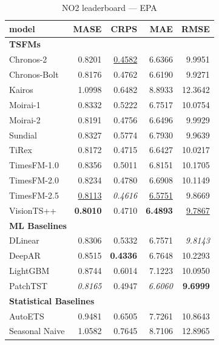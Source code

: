 \begin{table}[H]
\caption{NO2 leaderboard --- EPA}
\centering
\begin{small}
\begin{tabular}{lrrrr}
\toprule
model & MASE & CRPS & MAE & RMSE \\
\midrule
\multicolumn{5}{l}{\textbf{TSFMs}} \\
Chronos-2 & 0.8201 & \underline{0.4582} & 6.6366 & 9.9951 \\
Chronos-Bolt & 0.8176 & 0.4762 & 6.6190 & 9.9271 \\
Kairos & 1.0998 & 0.6482 & 8.8933 & 12.3642 \\
Moirai-1 & 0.8332 & 0.5222 & 6.7517 & 10.0754 \\
Moirai-2 & 0.8191 & 0.4756 & 6.6496 & 9.9929 \\
Sundial & 0.8327 & 0.5774 & 6.7930 & 9.9639 \\
TiRex & 0.8172 & 0.4715 & 6.6427 & 10.0217 \\
TimesFM-1.0 & 0.8356 & 0.5011 & 6.8151 & 10.1705 \\
TimesFM-2.0 & 0.8234 & 0.4780 & 6.6908 & 10.1149 \\
TimesFM-2.5 & \underline{0.8113} & \textit{0.4616} & \underline{6.5751} & 9.8669 \\
VisionTS++ & \textbf{0.8010} & 0.4710 & \textbf{6.4893} & \underline{9.7867} \\
\midrule
\multicolumn{5}{l}{\textbf{ML Baselines}} \\
DLinear & 0.8306 & 0.5332 & 6.7571 & \textit{9.8143} \\
DeepAR & 0.8515 & \textbf{0.4336} & 6.7648 & 10.2293 \\
LightGBM & 0.8744 & 0.6014 & 7.1223 & 10.0950 \\
PatchTST & \textit{0.8165} & 0.4947 & \textit{6.6060} & \textbf{9.6999} \\
\midrule
\multicolumn{5}{l}{\textbf{Statistical Baselines}} \\
AutoETS & 0.9481 & 0.6505 & 7.7261 & 10.8643 \\
Seasonal Naive & 1.0582 & 0.7645 & 8.7106 & 12.8965 \\
\bottomrule
\end{tabular}
\end{small}
\end{table}